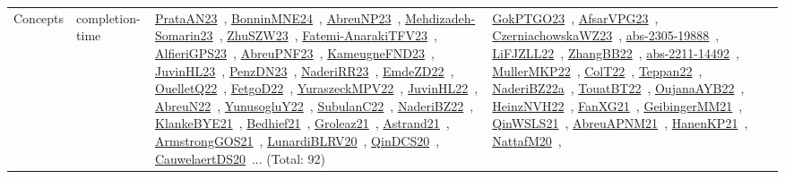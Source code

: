 {\begin{longtable}{lp{3cm}>{\raggedright\arraybackslash}p{6cm}>{\raggedright\arraybackslash}p{6cm}>{\raggedright\arraybackslash}p{8cm}}
Concepts & completion-time & \href{../works/PrataAN23.pdf}{PrataAN23}~\cite{PrataAN23}, \href{../works/BonninMNE24.pdf}{BonninMNE24}~\cite{BonninMNE24}, \href{../works/AbreuNP23.pdf}{AbreuNP23}~\cite{AbreuNP23}, \href{../works/Mehdizadeh-Somarin23.pdf}{Mehdizadeh-Somarin23}~\cite{Mehdizadeh-Somarin23}, \href{../works/ZhuSZW23.pdf}{ZhuSZW23}~\cite{ZhuSZW23}, \href{../works/Fatemi-AnarakiTFV23.pdf}{Fatemi-AnarakiTFV23}~\cite{Fatemi-AnarakiTFV23}, \href{../works/AlfieriGPS23.pdf}{AlfieriGPS23}~\cite{AlfieriGPS23}, \href{../works/AbreuPNF23.pdf}{AbreuPNF23}~\cite{AbreuPNF23}, \href{../works/KameugneFND23.pdf}{KameugneFND23}~\cite{KameugneFND23}, \href{../works/JuvinHL23.pdf}{JuvinHL23}~\cite{JuvinHL23}, \href{../works/PenzDN23.pdf}{PenzDN23}~\cite{PenzDN23}, \href{../works/NaderiRR23.pdf}{NaderiRR23}~\cite{NaderiRR23}, \href{../works/EmdeZD22.pdf}{EmdeZD22}~\cite{EmdeZD22}, \href{../works/OuelletQ22.pdf}{OuelletQ22}~\cite{OuelletQ22}, \href{../works/FetgoD22.pdf}{FetgoD22}~\cite{FetgoD22}, \href{../works/YuraszeckMPV22.pdf}{YuraszeckMPV22}~\cite{YuraszeckMPV22}, \href{../works/JuvinHL22.pdf}{JuvinHL22}~\cite{JuvinHL22}, \href{../works/AbreuN22.pdf}{AbreuN22}~\cite{AbreuN22}, \href{../works/YunusogluY22.pdf}{YunusogluY22}~\cite{YunusogluY22}, \href{../works/SubulanC22.pdf}{SubulanC22}~\cite{SubulanC22}, \href{../works/NaderiBZ22.pdf}{NaderiBZ22}~\cite{NaderiBZ22}, \href{../works/KlankeBYE21.pdf}{KlankeBYE21}~\cite{KlankeBYE21}, \href{../works/Bedhief21.pdf}{Bedhief21}~\cite{Bedhief21}, \href{../works/Groleaz21.pdf}{Groleaz21}~\cite{Groleaz21}, \href{../works/Astrand21.pdf}{Astrand21}~\cite{Astrand21}, \href{../works/ArmstrongGOS21.pdf}{ArmstrongGOS21}~\cite{ArmstrongGOS21}, \href{../works/LunardiBLRV20.pdf}{LunardiBLRV20}~\cite{LunardiBLRV20}, \href{../works/QinDCS20.pdf}{QinDCS20}~\cite{QinDCS20}, \href{../works/CauwelaertDS20.pdf}{CauwelaertDS20}~\cite{CauwelaertDS20}... (Total: 92) & \href{../works/GokPTGO23.pdf}{GokPTGO23}~\cite{GokPTGO23}, \href{../works/AfsarVPG23.pdf}{AfsarVPG23}~\cite{AfsarVPG23}, \href{../works/CzerniachowskaWZ23.pdf}{CzerniachowskaWZ23}~\cite{CzerniachowskaWZ23}, \href{../works/abs-2305-19888.pdf}{abs-2305-19888}~\cite{abs-2305-19888}, \href{../works/LiFJZLL22.pdf}{LiFJZLL22}~\cite{LiFJZLL22}, \href{../works/ZhangBB22.pdf}{ZhangBB22}~\cite{ZhangBB22}, \href{../works/abs-2211-14492.pdf}{abs-2211-14492}~\cite{abs-2211-14492}, \href{../works/MullerMKP22.pdf}{MullerMKP22}~\cite{MullerMKP22}, \href{../works/ColT22.pdf}{ColT22}~\cite{ColT22}, \href{../works/Teppan22.pdf}{Teppan22}~\cite{Teppan22}, \href{../works/NaderiBZ22a.pdf}{NaderiBZ22a}~\cite{NaderiBZ22a}, \href{../works/TouatBT22.pdf}{TouatBT22}~\cite{TouatBT22}, \href{../works/OujanaAYB22.pdf}{OujanaAYB22}~\cite{OujanaAYB22}, \href{../works/HeinzNVH22.pdf}{HeinzNVH22}~\cite{HeinzNVH22}, \href{../works/FanXG21.pdf}{FanXG21}~\cite{FanXG21}, \href{../works/GeibingerMM21.pdf}{GeibingerMM21}~\cite{GeibingerMM21}, \href{../works/QinWSLS21.pdf}{QinWSLS21}~\cite{QinWSLS21}, \href{../works/AbreuAPNM21.pdf}{AbreuAPNM21}~\cite{AbreuAPNM21}, \href{../works/HanenKP21.pdf}{HanenKP21}~\cite{HanenKP21}, \href{../works/NattafM20.pdf}{NattafM20}~\cite{NattafM20}, 
\end{longtable}}
